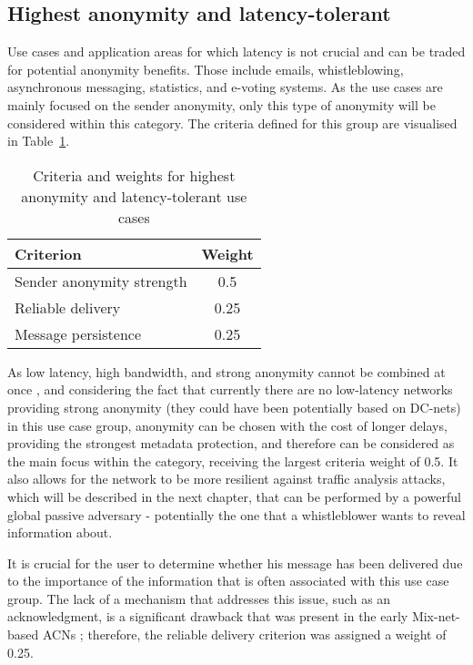 \subsection{Highest anonymity and latency-tolerant}
Use cases and application areas for which latency is not crucial and can be traded for potential anonymity benefits. Those include emails, whistleblowing, asynchronous messaging, statistics, and e-voting systems.
As the use cases are mainly focused on the sender anonymity, only this type of anonymity will be considered within this category.
The criteria defined for this group are visualised in Table~\ref{tab:high_anonymity_criteria}.

\begin{table}[!ht]
\centering
\caption{Criteria and weights for highest anonymity and latency-tolerant use cases}
\begin{tabular}{|l|c|}
\hline
\textbf{Criterion} & \textbf{Weight} \\
\hline
Sender anonymity strength & 0.5 \\
Reliable delivery & 0.25 \\
Message persistence & 0.25 \\
\hline
\end{tabular}
\label{tab:high_anonymity_criteria}
\end{table}


As low latency, high bandwidth, and strong anonymity cannot be combined at once \cite{anonymity-trillema}, and considering the fact that currently there are no low-latency networks providing strong anonymity (they could have been potentially based on DC-nets) in this use case group, anonymity can be chosen with the cost of longer delays, providing the strongest metadata protection, and therefore can be considered as the main focus within the category, receiving the largest criteria weight of 0.5. It also allows for the network to be more resilient against traffic analysis attacks, which will be described in the next chapter, that can be performed by a powerful global passive adversary - potentially the one that a whistleblower wants to reveal information about.

It is crucial for the user to determine whether his message has been delivered due to the importance of the information that is often associated with this use case group. The lack of a mechanism that addresses this issue, such as an acknowledgment, is a significant drawback that was present in the early Mix-net-based ACNs \cite{mix-net-reliability}; therefore, the reliable delivery criterion was assigned a weight of 0.25.

